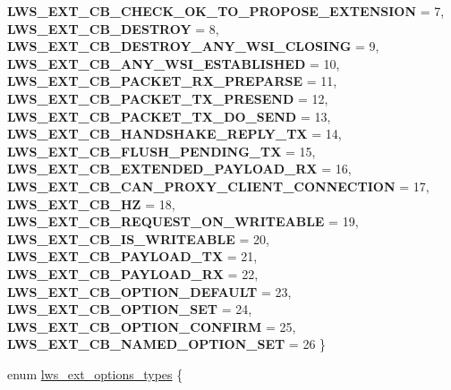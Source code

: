 \begin{DoxyCompactItemize}
{\bfseries L\+W\+S\+\_\+\+E\+X\+T\+\_\+\+C\+B\+\_\+\+C\+H\+E\+C\+K\+\_\+\+O\+K\+\_\+\+T\+O\+\_\+\+P\+R\+O\+P\+O\+S\+E\+\_\+\+E\+X\+T\+E\+N\+S\+I\+ON} = 7, 
{\bfseries L\+W\+S\+\_\+\+E\+X\+T\+\_\+\+C\+B\+\_\+\+D\+E\+S\+T\+R\+OY} = 8, 
\newline
{\bfseries L\+W\+S\+\_\+\+E\+X\+T\+\_\+\+C\+B\+\_\+\+D\+E\+S\+T\+R\+O\+Y\+\_\+\+A\+N\+Y\+\_\+\+W\+S\+I\+\_\+\+C\+L\+O\+S\+I\+NG} = 9, 
{\bfseries L\+W\+S\+\_\+\+E\+X\+T\+\_\+\+C\+B\+\_\+\+A\+N\+Y\+\_\+\+W\+S\+I\+\_\+\+E\+S\+T\+A\+B\+L\+I\+S\+H\+ED} = 10, 
{\bfseries L\+W\+S\+\_\+\+E\+X\+T\+\_\+\+C\+B\+\_\+\+P\+A\+C\+K\+E\+T\+\_\+\+R\+X\+\_\+\+P\+R\+E\+P\+A\+R\+SE} = 11, 
{\bfseries L\+W\+S\+\_\+\+E\+X\+T\+\_\+\+C\+B\+\_\+\+P\+A\+C\+K\+E\+T\+\_\+\+T\+X\+\_\+\+P\+R\+E\+S\+E\+ND} = 12, 
\newline
{\bfseries L\+W\+S\+\_\+\+E\+X\+T\+\_\+\+C\+B\+\_\+\+P\+A\+C\+K\+E\+T\+\_\+\+T\+X\+\_\+\+D\+O\+\_\+\+S\+E\+ND} = 13, 
{\bfseries L\+W\+S\+\_\+\+E\+X\+T\+\_\+\+C\+B\+\_\+\+H\+A\+N\+D\+S\+H\+A\+K\+E\+\_\+\+R\+E\+P\+L\+Y\+\_\+\+TX} = 14, 
{\bfseries L\+W\+S\+\_\+\+E\+X\+T\+\_\+\+C\+B\+\_\+\+F\+L\+U\+S\+H\+\_\+\+P\+E\+N\+D\+I\+N\+G\+\_\+\+TX} = 15, 
{\bfseries L\+W\+S\+\_\+\+E\+X\+T\+\_\+\+C\+B\+\_\+\+E\+X\+T\+E\+N\+D\+E\+D\+\_\+\+P\+A\+Y\+L\+O\+A\+D\+\_\+\+RX} = 16, 
\newline
{\bfseries L\+W\+S\+\_\+\+E\+X\+T\+\_\+\+C\+B\+\_\+\+C\+A\+N\+\_\+\+P\+R\+O\+X\+Y\+\_\+\+C\+L\+I\+E\+N\+T\+\_\+\+C\+O\+N\+N\+E\+C\+T\+I\+ON} = 17, 
{\bfseries L\+W\+S\+\_\+\+E\+X\+T\+\_\+\+C\+B\+\_\+HZ} = 18, 
{\bfseries L\+W\+S\+\_\+\+E\+X\+T\+\_\+\+C\+B\+\_\+\+R\+E\+Q\+U\+E\+S\+T\+\_\+\+O\+N\+\_\+\+W\+R\+I\+T\+E\+A\+B\+LE} = 19, 
{\bfseries L\+W\+S\+\_\+\+E\+X\+T\+\_\+\+C\+B\+\_\+\+I\+S\+\_\+\+W\+R\+I\+T\+E\+A\+B\+LE} = 20, 
\newline
{\bfseries L\+W\+S\+\_\+\+E\+X\+T\+\_\+\+C\+B\+\_\+\+P\+A\+Y\+L\+O\+A\+D\+\_\+\+TX} = 21, 
{\bfseries L\+W\+S\+\_\+\+E\+X\+T\+\_\+\+C\+B\+\_\+\+P\+A\+Y\+L\+O\+A\+D\+\_\+\+RX} = 22, 
{\bfseries L\+W\+S\+\_\+\+E\+X\+T\+\_\+\+C\+B\+\_\+\+O\+P\+T\+I\+O\+N\+\_\+\+D\+E\+F\+A\+U\+LT} = 23, 
{\bfseries L\+W\+S\+\_\+\+E\+X\+T\+\_\+\+C\+B\+\_\+\+O\+P\+T\+I\+O\+N\+\_\+\+S\+ET} = 24, 
\newline
{\bfseries L\+W\+S\+\_\+\+E\+X\+T\+\_\+\+C\+B\+\_\+\+O\+P\+T\+I\+O\+N\+\_\+\+C\+O\+N\+F\+I\+RM} = 25, 
{\bfseries L\+W\+S\+\_\+\+E\+X\+T\+\_\+\+C\+B\+\_\+\+N\+A\+M\+E\+D\+\_\+\+O\+P\+T\+I\+O\+N\+\_\+\+S\+ET} = 26
 \}
\item 
enum \hyperlink{group__extensions_gacc9f55936dc165257a2e1f7d47bce89e}{lws\+\_\+ext\+\_\+options\+\_\+types} \{ \newline

\end{DoxyCompactItemize}
